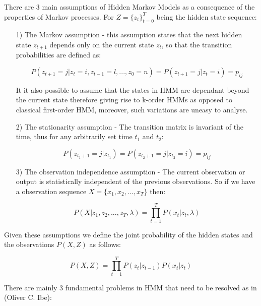 There are 3 main assumptions of Hidden Markov Models as a consequence of the properties of Markov processes. For $Z = \{z_t\}_{t=0}^T$ being the hidden state sequence:

\begin{itemize}
\item[1)] The Markov assumption - this assumption states that the next hidden state $z_{t+1}$ depends only on the current state $z_t$, so that the transition probabilities are defined as:

\begin{equation}
P(z_{t+1} = j| z_{t} = i,z_{t-1} = l,...,z_{0} = n) = P(z_{t+1} = j| z_{t} = i) = p_{ij}
\end{equation}

It it also possible to assume that the states in HMM are dependant beyond the current state therefore giving rise to k-order HMMs as opposed to classical first-order HMM, moreover, such variations are uneasy to analyse.

\item[2)] The stationarity assumption - The transition matrix is invariant of the time, thus for any arbitrarily set time $t_1$ and $t_2$:

\begin{equation}
P(z_{t_1+1} = j| z_{t_1}) = P(z_{t_2+1} = j| z_{t_2} = i) = p_{ij}
\end{equation}

\item[3)] The observation independence assumption - The current observation or output is statistically independent of the previous observations. So if we have a observation sequence $X = \{x_1,x_2,...,x_T\}$ then:

\begin{equation}
P(X|z_1,z_2,...,z_T, \lambda) = \prod_{t=1}^T P(x_t|z_t,\lambda)
\end{equation}

\end{itemize}

Given these assumptions we define the joint probability of the hidden states and the observations $P(X,Z)$ as follows:

\begin{equation}
P(X, Z) = \prod_{t=1}^T P(z_t|z_{t-1}) P(x_t|z_t)
\end{equation}



There are mainly 3 fundamental problems in HMM that need to be resolved as in (Oliver C. Ibe):

